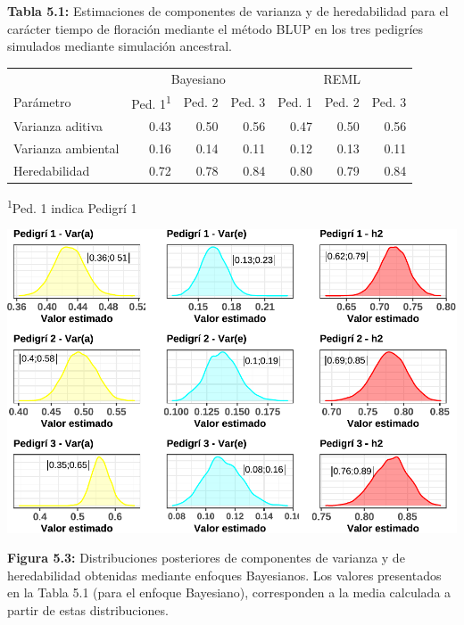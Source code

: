 \documentclass[11pt,spanish,a4paper,oneside,]{book} %
\begin{document}
\hspace*{1em}

\noindent
\textbf{Tabla 5.1:} Estimaciones de componentes de varianza y de heredabilidad para el carácter tiempo de floración mediante el método BLUP en los tres pedigríes simulados mediante simulación ancestral.

\captionsetup[table]{labelformat=empty,skip=1pt}
\begin{longtable}{lrrrrrr}
\toprule
 & \multicolumn{3}{c}{Bayesiano} & \multicolumn{3}{c}{REML} \\ 
 \cmidrule(lr){2-4} \cmidrule(lr){5-7}
Parámetro & Ped. 1\textsuperscript{1} & Ped. 2 & Ped. 3 & Ped. 1 & Ped. 2 & Ped. 3 \\ 
\midrule
Varianza aditiva & 0.43 & 0.50 & 0.56 & 0.47 & 0.50 & 0.56 \\ 
Varianza ambiental & 0.16 & 0.14 & 0.11 & 0.12 & 0.13 & 0.11 \\ 
Heredabilidad & 0.72 & 0.78 & 0.84 & 0.80 & 0.79 & 0.84 \\ 
 \bottomrule
\end{longtable}
\vspace{-5mm}
\begin{minipage}{\linewidth}
\textsuperscript{1}Ped. 1 indica Pedigrí 1 \\ 
\end{minipage}

\begin{center}\includegraphics[width=1\linewidth]{figures/covar_h2} \end{center}

\noindent
\textbf{Figura 5.3:} Distribuciones posteriores de componentes de varianza y de heredabilidad obtenidas mediante enfoques Bayesianos. Los valores presentados en la Tabla 5.1 (para el enfoque Bayesiano), corresponden a la media calculada a partir de estas distribuciones.
\end{document}
